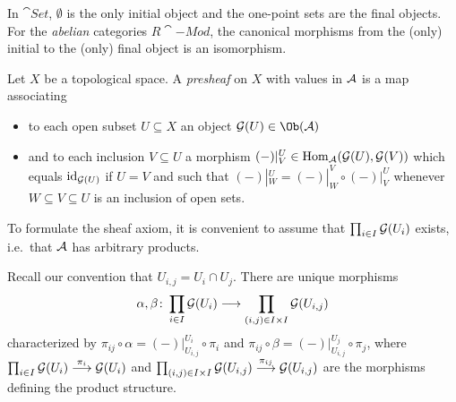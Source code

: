 \documentclass[a4paper,parskip=half,numbers=enddot, DIV=12]{scrreprt}
\begin{document}
  \begin{rem*}
  	In $\cat{Set}$, $\emptyset$ is the only initial object and the one-point sets are the final objects. For the \emph{abelian} categories $R\cat{-Mod}$, the canonical morphisms from the (only) initial to the (only) final object is an isomorphism.
  \end{rem*}
	Let $X$ be a topological space. A \emph{presheaf} on $X$ with values in $\mathcal{A}$ is a map associating
	\begin{itemize}
		\item to each open subset $U\subseteq X$ an object $\Gg(U)\in\Ob(\Aa)$
		\item and to each inclusion $V\subseteq U$ a morphism $(-)|_V^U\in\operatorname{Hom}_{\mathcal{A}}(\mathcal{G}(U), \mathcal{G}(V))$ which equals $\operatorname{id}_{\mathcal{G}(U)}$ if $U=V$ and such that $(-)|_W^U=(-)|_W^V\circ(-)|_V^U$ whenever $W\subseteq V\subseteq U$ is an inclusion of open sets.
	\end{itemize}
	To formulate the sheaf axiom, it is convenient to assume that $\prod_{i\in I}\mathcal{G}(U_i)$ exists, i.e.\ that $\mathcal{A}$ has arbitrary products.
	
	Recall our convention that $U_{i,j}=U_i\cap U_j$. There are unique morphisms
	\begin{align*}
		\alpha,\beta\colon \prod_{i\in I}\mathcal{G}(U_i)\longrightarrow\prod_{(i,j)\in I\times I}\mathcal{G}(U_{i,j})
	\end{align*}
	characterized by $\pi_{ij}\circ\alpha=(-)|_{U_{i,j}}^{U_i}\circ\pi_i$ and $\pi_{ij}\circ\beta=(-)|_{U_{i,j}}^{U_j}\circ\pi_j$, where $\prod_{i\in I}\Gg(U_i)\morphism[\pi_i]\Gg(U_i)$ and $\prod_{(i,j)\in I\times I}\Gg(U_{i,j})\morphism[\pi_{ij}]\Gg(U_{i,j})$ are the morphisms defining the product structure.
	
\end{document}
